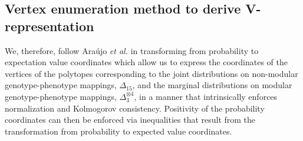 \subsection*{Vertex enumeration method to derive V-representation}
We, therefore, follow Ara\'{u}jo {\it et al.} \cite{Araujo2012} in transforming from probability to expectation value coordinates which allow us to express the coordinates of the vertices of the polytopes corresponding to the joint distributions on non-modular genotype-phenotype mappings, $\Delta_{15}$, and the marginal distributions on modular genotype-phenotype mappings, $\Delta_3^{\otimes 4}$, in a manner that intrinsically enforces normalization and Kolmogorov consistency. Positivity of the probability coordinates can then be enforced via inequalities that result from the transformation from probability to expected value coordinates.

